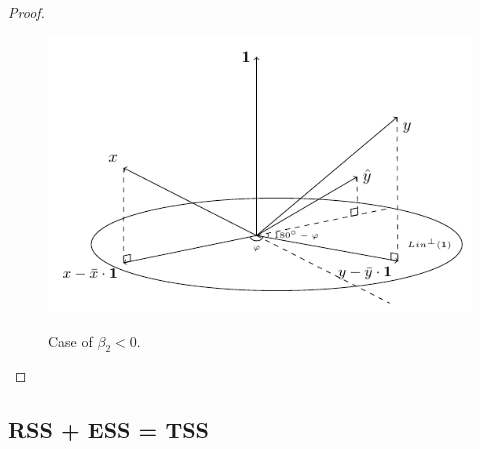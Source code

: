 \begin{proof}
\begin{figure}[h!]
\begin{center}
\includegraphics{figures/02_simple_regression_coefficient_negative.pdf}
\label{fig:corr_negative}
\caption{Case of $\beta_2 < 0$.}
\end{center}
\end{figure}
\end{proof}


\subsection{RSS + ESS = TSS}

